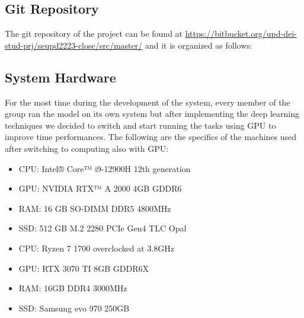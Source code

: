 \subsection{Git Repository}
The git repository of the project can be found at
\url{https://bitbucket.org/upd-dei-stud-prj/seupd2223-close/src/master/} and it is organized as follows:


\subsection{System Hardware}
For the most time during the development of the system, every member of the group ran the model on its own system but after implementing the deep learning techniques we decided to switch and start running the tasks using GPU to improve time performances.
The following are the specifics of the machines used after switching to computing also with GPU:
\begin{itemize}
	\item CPU: Intel® Core™ i9-12900H 12th generation
	\item GPU: NVIDIA RTX™ A 2000 4GB GDDR6
	\item RAM: 16 GB SO-DIMM DDR5 4800MHz
	\item SSD: 512 GB M.2 2280 PCIe Gen4 TLC Opal
\end{itemize}
\begin{itemize}
	\item CPU: Ryzen 7 1700 overclocked at 3.8GHz
	\item GPU: RTX 3070 TI 8GB GDDR6X
	\item RAM: 16GB  DDR4 3000MHz
	\item SSD: Samsung evo 970 250GB
\end{itemize}



